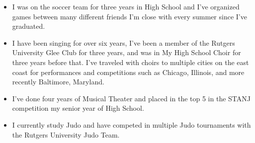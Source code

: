 \documentclass[12pt,a4paper,sans]{moderncv}        %
\begin{document}
\begin{itemize}

\item{I was on the soccer team for three years in High School and I've organized games between many different friends I'm close with every summer since I've graduated.}

\vspace{6pt}

\item{I have been singing for over six years, I've been a member of the Rutgers University Glee Club for three years, and was in My High School Choir for three years before that. I've traveled with choirs to multiple cities on the east coast for performances and competitions such as Chicago, Illinois, and more recently Baltimore, Maryland.} 

\vspace{6pt}

\item{I've done four years of Musical Theater and placed in the top 5 in the STANJ competition my senior year of High School.}

\vspace{6pt}

\item{I currently study Judo and have competed in multiple Judo tournaments with the Rutgers University Judo Team.}

\vspace{6pt}

\end{itemize}


\nocite{*}

         
\end{document}
